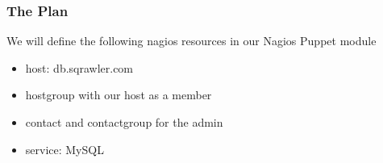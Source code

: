 \documentclass[10pt]{beamer}
\begin{document}
\begin{frame}
  \frametitle{The Plan}
  
  We will define the following nagios resources in our Nagios Puppet module
\begin{itemize}
\item host:  db.sqrawler.com
\item hostgroup with our host as a member
\item contact and contactgroup for the admin
\item service:  MySQL
\end{itemize}
\end{frame}



%
%
\end{document}
